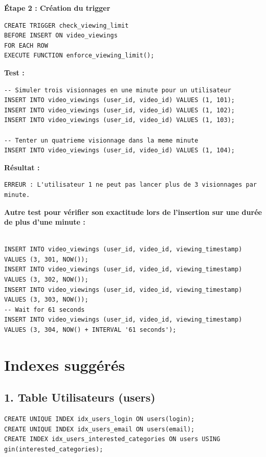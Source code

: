 \documentclass[a4paper, 12pt]{article}
\begin{document}
\textbf{Étape 2 : Création du trigger}

\begin{lstlisting}
CREATE TRIGGER check_viewing_limit
BEFORE INSERT ON video_viewings
FOR EACH ROW
EXECUTE FUNCTION enforce_viewing_limit();
\end{lstlisting}

\textbf{Test :}

\begin{lstlisting}
-- Simuler trois visionnages en une minute pour un utilisateur
INSERT INTO video_viewings (user_id, video_id) VALUES (1, 101);
INSERT INTO video_viewings (user_id, video_id) VALUES (1, 102);
INSERT INTO video_viewings (user_id, video_id) VALUES (1, 103);

-- Tenter un quatrieme visionnage dans la meme minute
INSERT INTO video_viewings (user_id, video_id) VALUES (1, 104);
\end{lstlisting}

\textbf{Résultat :}

\begin{verbatim}
ERREUR : L'utilisateur 1 ne peut pas lancer plus de 3 visionnages par minute.
\end{verbatim}

\textbf{Autre test pour vérifier son exactitude lors de l'insertion sur une durée de plus d'une minute :}

\begin{lstlisting}

INSERT INTO video_viewings (user_id, video_id, viewing_timestamp) VALUES (3, 301, NOW());
INSERT INTO video_viewings (user_id, video_id, viewing_timestamp) VALUES (3, 302, NOW());
INSERT INTO video_viewings (user_id, video_id, viewing_timestamp) VALUES (3, 303, NOW());
-- Wait for 61 seconds
INSERT INTO video_viewings (user_id, video_id, viewing_timestamp) VALUES (3, 304, NOW() + INTERVAL '61 seconds');

    \end{lstlisting}

\section*{Indexes suggérés}

\subsection*{1. Table Utilisateurs (users)}

\begin{lstlisting}
CREATE UNIQUE INDEX idx_users_login ON users(login);
CREATE UNIQUE INDEX idx_users_email ON users(email);
CREATE INDEX idx_users_interested_categories ON users USING gin(interested_categories);
\end{lstlisting}
\end{document}
